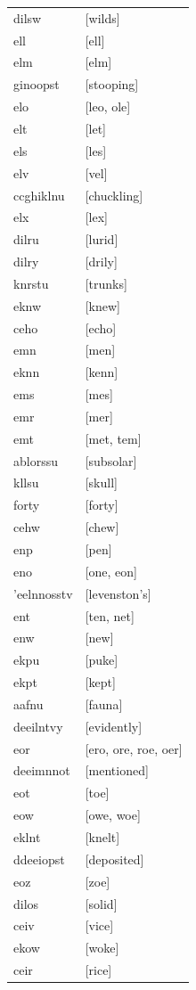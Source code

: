 \documentclass{article}
\begin{document}
\begin{tabular}{ll}
dilsw & [wilds] \\
ell & [ell] \\
elm & [elm] \\
ginoopst & [stooping] \\
elo & [leo, ole] \\
elt & [let] \\
els & [les] \\
elv & [vel] \\
ccghiklnu & [chuckling] \\
elx & [lex] \\
dilru & [lurid] \\
dilry & [drily] \\
knrstu & [trunks] \\
eknw & [knew] \\
ceho & [echo] \\
emn & [men] \\
eknn & [kenn] \\
ems & [mes] \\
emr & [mer] \\
emt & [met, tem] \\
ablorssu & [subsolar] \\
kllsu & [skull] \\
forty & [forty] \\
cehw & [chew] \\
enp & [pen] \\
eno & [one, eon] \\
'eelnnosstv & [levenston's] \\
ent & [ten, net] \\
enw & [new] \\
ekpu & [puke] \\
ekpt & [kept] \\
aafnu & [fauna] \\
deeilntvy & [evidently] \\
eor & [ero, ore, roe, oer] \\
deeimnnot & [mentioned] \\
eot & [toe] \\
eow & [owe, woe] \\
eklnt & [knelt] \\
ddeeiopst & [deposited] \\
eoz & [zoe] \\
dilos & [solid] \\
ceiv & [vice] \\
ekow & [woke] \\
ceir & [rice] \\

\end{tabular}
\end{document}
